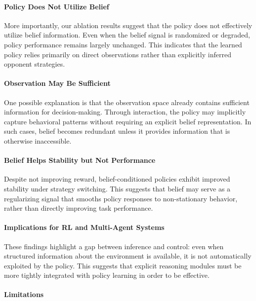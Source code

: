 \documentclass{article}
\begin{document}
\paragraph{Policy Does Not Utilize Belief}

More importantly, our ablation results suggest that the policy does not effectively utilize belief information. 
Even when the belief signal is randomized or degraded, policy performance remains largely unchanged. 
This indicates that the learned policy relies primarily on direct observations rather than explicitly inferred opponent strategies.

\paragraph{Observation May Be Sufficient}

One possible explanation is that the observation space already contains sufficient information for decision-making. 
Through interaction, the policy may implicitly capture behavioral patterns without requiring an explicit belief representation. 
In such cases, belief becomes redundant unless it provides information that is otherwise inaccessible.

\paragraph{Belief Helps Stability but Not Performance}

Despite not improving reward, belief-conditioned policies exhibit improved stability under strategy switching. 
This suggests that belief may serve as a regularizing signal that smooths policy responses to non-stationary behavior, 
rather than directly improving task performance.

\paragraph{Implications for RL and Multi-Agent Systems}

These findings highlight a gap between inference and control: 
even when structured information about the environment is available, 
it is not automatically exploited by the policy. 
This suggests that explicit reasoning modules must be more tightly integrated with policy learning in order to be effective.

\paragraph{Limitations}
\end{document}
